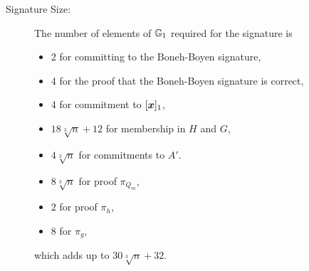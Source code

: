 
\begin{description}
\item[Signature Size:] The number of elements of $\mathbb{G}_1$ required  for the signature is
\begin{itemize}
\item 2 for committing to the Boneh-Boyen signature,
\item 4 for the proof that the Boneh-Boyen signature is correct,
\item 4 for commitment to $[{\boldsymbol{x}}]_1$,
\item $18\sqrt[3]{n} + 12$ for membership in $H$ and $G$,
\item $4\sqrt[3]{n}$ for commitments to $A'$.
\item $8\sqrt[3]{n}$ for proof  $\pi_{Q_m}$,
\item $2$ for proof $\pi_h$,
\item $8$ for $\pi_g$,
\end{itemize}
which adds up to $30\sqrt[3]{n} + 32$.


\end{description}
